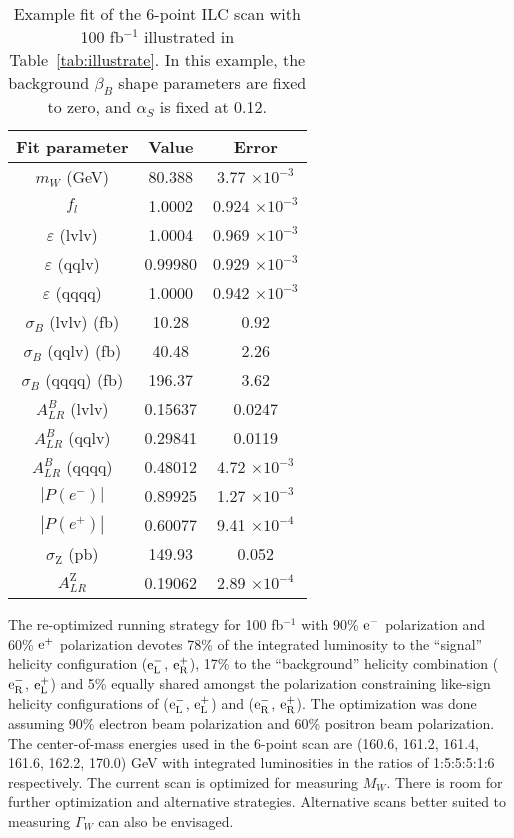 \documentclass[12pt]{article}
\begin{document}
\begin{table}[!htb]
\begin{center}
\begin{tabular}{c|c|c}
Fit parameter & Value & Error \\ \hline
   $m_{W}$ (GeV) &      80.388     &  3.77 $\times 10^{-3}$  \\ \hline
   $f_l$ &      1.0002     &  0.924 $\times 10^{-3}$  \\ \hline
   $\varepsilon$ (lvlv) &     1.0004     &  0.969 $\times 10^{-3}$  \\
   $\varepsilon$ (qqlv) &    0.99980     &  0.929 $\times 10^{-3}$  \\
   $\varepsilon$ (qqqq) &     1.0000     &  0.942 $\times 10^{-3}$  \\ \hline
   $\sigma_B$ (lvlv) (fb) &     10.28  &  0.92   \\
   $\sigma_B$ (qqlv) (fb) &     40.48  &  2.26  \\
   $\sigma_B$ (qqqq) (fb) &     196.37     &  3.62 \\
   $A_{LR}^B $ (lvlv) &     0.15637     &  0.0247  \\
   $A_{LR}^B $ (qqlv) &     0.29841     &  0.0119  \\
   $A_{LR}^B $ (qqqq) &     0.48012     &  4.72 $\times 10^{-3}$  \\ \hline
   $|P(e^{-})|$   &     0.89925     &  1.27 $\times 10^{-3}$  \\
   $|P(e^{+})|$  &     0.60077     &  9.41 $\times 10^{-4}$  \\
   $\sigma_{\mathrm{Z}}$ (pb) &      149.93     &  0.052  \\ 
   $A_{LR}^{\mathrm{Z}}$ &     0.19062     &  2.89 $\times 10^{-4}$  \\
\hline
\end{tabular}
\caption{Example fit of the 6-point ILC scan with 100 fb$^{-1}$ illustrated in Table~\ref{tab:illustrate}. In this example, 
the background $\beta_B$ shape parameters are fixed to zero, and $\alpha_S$ is fixed at 0.12.}
\label{tab:Minuit}
\end{center}
\end{table}

The re-optimized running strategy for 100 fb$^{-1}$ with 90\% $\rm{e}^-$ polarization and 60\% $\rm{e}^+$ polarization 
devotes 78\% of the integrated luminosity to the ``signal'' helicity 
configuration ($\rm{e}_L^-$, $\rm{e}_R^+$), 17\% to the ``background'' helicity 
combination ($\rm{e}_R^-$, $\rm{e}_L^+$) and 5\% equally shared amongst 
the polarization constraining like-sign helicity configurations 
of ($\rm{e}_L^-$, $\rm{e}_L^+$) and ($\rm{e}_R^-$, $\rm{e}_R^+$). The optimization was done assuming 90\% electron beam polarization 
and 60\% positron beam polarization.
The center-of-mass energies used in the 6-point scan 
are (160.6, 161.2, 161.4, 161.6, 162.2, 170.0) GeV with integrated luminosities in the ratios of 1:5:5:5:1:6 
respectively.
The current scan is optimized for measuring $M_W$.
There is room for further optimization and alternative strategies. 
Alternative scans better suited to measuring $\Gamma_W$ can also be envisaged.
\end{document}
